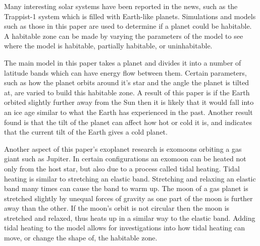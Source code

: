 \documentclass[12pt, onecolumn]{revtex4-2}    %
\begin{document}
Many interesting solar systems have been reported in the news, such as the Trappist-1 system which is filled with Earth-like planets.
Simulations and models such as those in this paper are used to determine if a planet could be habitable.
A habitable zone can be made by varying the parameters of the model to see where the model is habitable, partially habitable, or uninhabitable.

The main model in this paper takes a planet and divides it into a number of latitude bands which can have energy flow between them.
Certain parameters, such as how the planet orbits around it's star and the angle the planet is tilted at, are varied to build this habitable zone.
A result of this paper is if the Earth orbited slightly further away from the Sun then it is likely that it would fall into an ice age similar to what the Earth has experienced in the past.
Another result found is that the tilt of the planet can affect how hot or cold it is, and indicates that the current tilt of the Earth gives a cold planet.

Another aspect of this paper's exoplanet research is exomoons orbiting a gas giant such as Jupiter.
In certain configurations an exomoon can be heated not only from the host star, but also due to a process called tidal heating.
Tidal heating is similar to stretching an elastic band.
Stretching and relaxing an elastic band many times can cause the band to warm up.
The moon of a gas planet is stretched slightly by unequal forces of gravity as one part of the moon is further away than the other.
If the moon's orbit is not circular then the moon is stretched and relaxed, thus heats up in a similar way to the elastic band.
Adding tidal heating to the model allows for investigations into how tidal heating can move, or change the shape of, the habitable zone.
\end{document}
